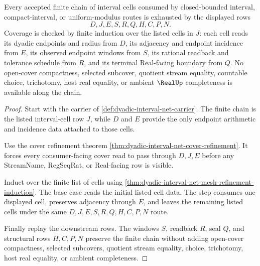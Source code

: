 \begin{theorem}
\label{thm:dyadic-interval-net-finite-chain-coverage}
Every accepted finite chain of interval cells consumed by closed-bounded interval, compact-interval, or uniform-modulus routes is exhausted by the displayed rows
$$
D,J,E,S,R,Q,H,C,P,N .
$$
Coverage is checked by finite induction over the listed cells in $J$: each cell reads its dyadic endpoints and radius from $D$, its adjacency and endpoint incidence from $E$, its observed endpoint windows from $S$, its rational readback and tolerance schedule from $R$, and its terminal Real-facing boundary from $Q$. No open-cover compactness, selected subcover, quotient stream equality, countable choice, trichotomy, host real equality, or ambient $\RealUp$ completeness is available along the chain.
\end{theorem}
\begin{proof}
Start with the carrier of \autoref{def:dyadic-interval-net-carrier}. The finite chain is the listed interval-cell row $J$, while $D$ and $E$ provide the only endpoint arithmetic and incidence data attached to those cells.

Use the cover refinement theorem \autoref{thm:dyadic-interval-net-cover-refinement}. It forces every consumer-facing cover read to pass through $D,J,E$ before any StreamName, RegSeqRat, or Real-facing row is visible.

Induct over the finite list of cells using \autoref{thm:dyadic-interval-net-mesh-refinement-induction}. The base case reads the initial listed cell data. The step consumes one displayed cell, preserves adjacency through $E$, and leaves the remaining listed cells under the same $D,J,E,S,R,Q,H,C,P,N$ route.

Finally replay the downstream rows. The windows $S$, readback $R$, seal $Q$, and structural rows $H,C,P,N$ preserve the finite chain without adding open-cover compactness, selected subcovers, quotient stream equality, choice, trichotomy, host real equality, or ambient completeness.
\end{proof}

